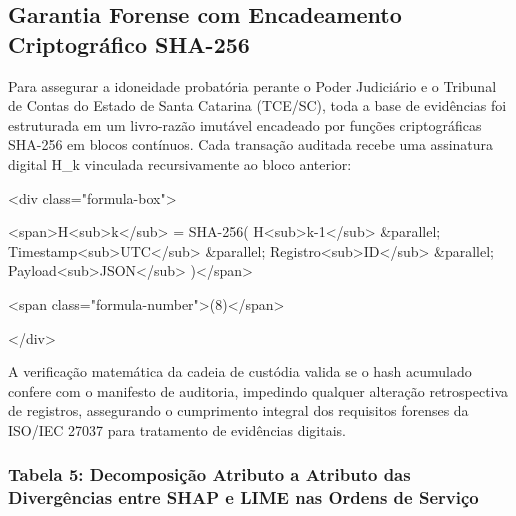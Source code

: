 \documentclass[12pt,a4paper]{article}
\begin{document}
\subsection{Garantia Forense com Encadeamento Criptográfico SHA-256}

Para assegurar a idoneidade probatória perante o Poder Judiciário e o Tribunal de Contas do Estado de Santa Catarina (TCE/SC), toda a base de evidências foi estruturada em um livro-razão imutável encadeado por funções criptográficas SHA-256 em blocos contínuos. Cada transação auditada recebe uma assinatura digital H\_k vinculada recursivamente ao bloco anterior:

<div class="formula-box">

<span>H<sub>k</sub> = SHA-256( H<sub>k-1</sub> \&parallel; Timestamp<sub>UTC</sub> \&parallel; Registro<sub>ID</sub> \&parallel; Payload<sub>JSON</sub> )</span>

<span class="formula-number">(8)</span>

</div>

A verificação matemática da cadeia de custódia valida se o hash acumulado confere com o manifesto de auditoria, impedindo qualquer alteração retrospectiva de registros, assegurando o cumprimento integral dos requisitos forenses da ISO/IEC 27037 para tratamento de evidências digitais.


\subsubsection{Tabela 5: Decomposição Atributo a Atributo das Divergências entre SHAP e LIME nas Ordens de Serviço}
\end{document}

